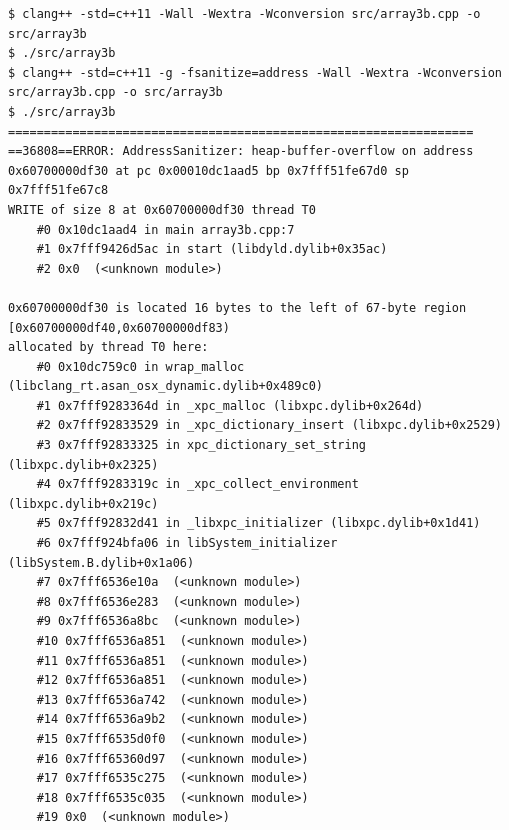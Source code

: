 \documentclass[12pt,letterpaper,twoside]{article}
\begin{document}
\begin{verbatim}
$ clang++ -std=c++11 -Wall -Wextra -Wconversion src/array3b.cpp -o src/array3b
$ ./src/array3b
$ clang++ -std=c++11 -g -fsanitize=address -Wall -Wextra -Wconversion src/array3b.cpp -o src/array3b
$ ./src/array3b
=================================================================
==36808==ERROR: AddressSanitizer: heap-buffer-overflow on address 0x60700000df30 at pc 0x00010dc1aad5 bp 0x7fff51fe67d0 sp 0x7fff51fe67c8
WRITE of size 8 at 0x60700000df30 thread T0
    #0 0x10dc1aad4 in main array3b.cpp:7
    #1 0x7fff9426d5ac in start (libdyld.dylib+0x35ac)
    #2 0x0  (<unknown module>)

0x60700000df30 is located 16 bytes to the left of 67-byte region [0x60700000df40,0x60700000df83)
allocated by thread T0 here:
    #0 0x10dc759c0 in wrap_malloc (libclang_rt.asan_osx_dynamic.dylib+0x489c0)
    #1 0x7fff9283364d in _xpc_malloc (libxpc.dylib+0x264d)
    #2 0x7fff92833529 in _xpc_dictionary_insert (libxpc.dylib+0x2529)
    #3 0x7fff92833325 in xpc_dictionary_set_string (libxpc.dylib+0x2325)
    #4 0x7fff9283319c in _xpc_collect_environment (libxpc.dylib+0x219c)
    #5 0x7fff92832d41 in _libxpc_initializer (libxpc.dylib+0x1d41)
    #6 0x7fff924bfa06 in libSystem_initializer (libSystem.B.dylib+0x1a06)
    #7 0x7fff6536e10a  (<unknown module>)
    #8 0x7fff6536e283  (<unknown module>)
    #9 0x7fff6536a8bc  (<unknown module>)
    #10 0x7fff6536a851  (<unknown module>)
    #11 0x7fff6536a851  (<unknown module>)
    #12 0x7fff6536a851  (<unknown module>)
    #13 0x7fff6536a742  (<unknown module>)
    #14 0x7fff6536a9b2  (<unknown module>)
    #15 0x7fff6535d0f0  (<unknown module>)
    #16 0x7fff65360d97  (<unknown module>)
    #17 0x7fff6535c275  (<unknown module>)
    #18 0x7fff6535c035  (<unknown module>)
    #19 0x0  (<unknown module>)


\end{verbatim}
\end{document}
